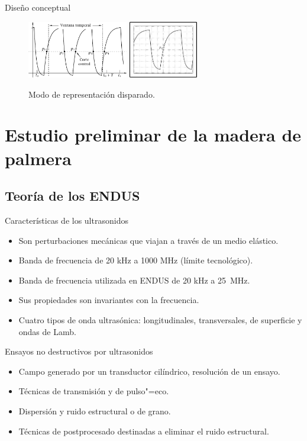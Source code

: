 \documentclass[utf8, compress]			{beamer}
\begin{document}
\begin{frame}{Diseño conceptual}
    \begin{figure}
	\hfill
	\includegraphics[height=25mm, keepaspectratio]{ventana.pdf}
	\hspace{3em}
	\includegraphics[height=25mm, keepaspectratio]{disparo.pdf}
	\hfill
	\caption{Modo de representación disparado.}
	\label{fig:triggered}
    \end{figure}
\end{frame}


\section{Estudio preliminar de la madera de palmera}

\subsection{Teoría de los ENDUS}

\begin{frame}{Características de los ultrasonidos}
    \begin{itemize}
	\item Son perturbaciones mecánicas que viajan a través de un medio
	    elástico.
	\item Banda de frecuencia de 20 kHz a 1000 MHz (límite
	    tecnológico).
	\item Banda de frecuencia utilizada en ENDUS de 20 kHz a 25~MHz.
	\item Sus propiedades son invariantes con la frecuencia.
	\item Cuatro tipos de onda ultrasónica: longitudinales,
	    transversales, de superficie y ondas de Lamb.
    \end{itemize}
\end{frame}

\begin{frame}{Ensayos no destructivos por ultrasonidos}
    \begin{itemize}
	\item Campo generado por un transductor cilíndrico, resolución de
	    un ensayo.
	\item Técnicas de transmisión y de pulso"=eco.
	\item Dispersión y ruido estructural o de grano.
	\item Técnicas de postprocesado destinadas a eliminar el ruido
	    estructural.
    \end{itemize}
\end{frame}
\end{document}
